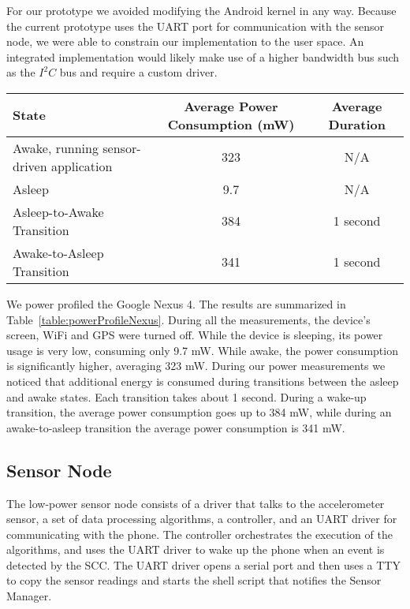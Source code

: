 For our prototype we avoided modifying the Android kernel in any way.
Because the current prototype uses the UART port for communication
with the sensor node, we were able to constrain our implementation to
the user space.  An integrated implementation would likely make use of
a higher bandwidth bus such as the $I^2C$ bus and require a custom
driver.

\bgroup
\def\arraystretch{1.5}
\begin{table*}[t]
\centering
{\small
	\begin{tabular}{| l | c | c |}
		\hline
		\textbf{State}								& \textbf{Average Power Consumption (mW)} 		& \textbf{Average Duration} \\ \hline
		Awake, running sensor-driven application 	& 323 											& N/A \\ \hline
		Asleep 										& 9.7 											& N/A \\ \hline
		Asleep-to-Awake Transition 					& 384 											& 1 second \\ \hline
		Awake-to-Asleep Transition 					& 341 											& 1 second \\ \hline
	\end{tabular}
}
	\caption{Google Nexus 4 power profile.}
	\label{table:powerProfileNexus}
\end{table*}
\egroup

We power profiled the Google Nexus 4.  The results are summarized in
Table~\ref{table:powerProfileNexus}.  During all the measurements, the
device's screen, WiFi and GPS were turned off.  While the device is
sleeping, its power usage is very low, consuming only 9.7 mW.  While
awake, the power consumption is significantly higher, averaging 323
mW.  During our power measurements we noticed that additional energy is
consumed during transitions between the asleep and awake states.  Each
transition takes about 1 second.  During a wake-up transition, the
average power consumption goes up to 384 mW, while during an
awake-to-asleep transition the average power consumption is 341 mW.


\subsection{Sensor Node}
\label{subsec:sensorNode}

The low-power sensor node consists of a driver that talks to
the accelerometer sensor, a set of data processing algorithms, a controller,
and an UART driver for communicating with the phone.  The controller
orchestrates the execution of the algorithms, and uses the UART driver to
wake up the phone when an event is detected by the SCC.  The UART driver
opens a serial port and then uses a TTY to copy the sensor readings
and starts the shell script that notifies the Sensor Manager.


